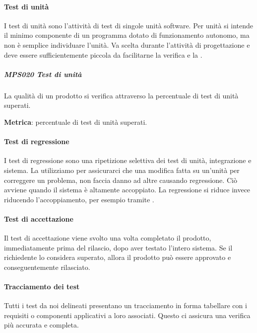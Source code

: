 			\paragraph{Test di unità} \label{testunita}
			I test di unità sono l'attività di test di singole unità software.
			Per unità si intende il minimo componente di un programma dotato di funzionamento autonomo, ma non è semplice individuare l'unità.
			Va scelta durante l'attività di progettazione e deve essere sufficientemente piccola da facilitarne la verifica e la .

            \subparagraph{MPS020 Test di unità}\label{testunita:met}
            La qualità di un prodotto si verifica attraverso la percentuale di test di unità superati.

            \textbf{Metrica}: percentuale di test di unità superati.

			\paragraph{Test di regressione} \label{testregressione}
			I test di regressione sono una ripetizione selettiva dei test di unità, integrazione e sistema.
			La utilizziamo per assicurarci che una modifica fatta su un'unità per correggere un problema, non faccia danno ad altre causando regressione.
			Ciò avviene quando il sistema è altamente accoppiato.
			La regressione si riduce invece riducendo l'accoppiamento, per esempio tramite .

			\paragraph{Test di accettazione} \label{testaccettazione}
			Il test di accettazione viene svolto una volta completato il prodotto, immediatamente prima del rilascio, dopo aver testato l'intero sistema.
			Se il richiedente lo considera superato, allora il prodotto può essere approvato e conseguentemente rilasciato.

			\paragraph{Tracciamento dei test} \label{TracciamentoTest}
			Tutti i test da noi delineati presentano un tracciamento in forma tabellare con i requisiti o componenti applicativi a loro associati.
			Questo ci assicura una verifica più accurata e completa.


